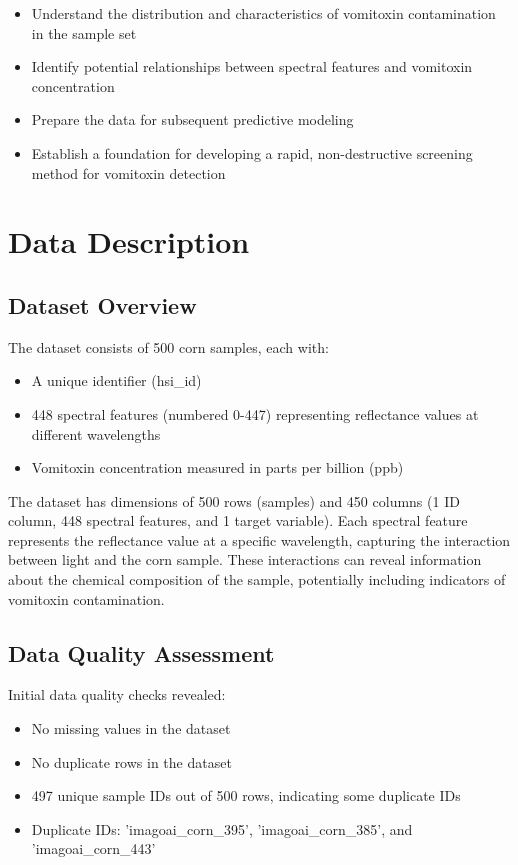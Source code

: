 \documentclass[12pt,a4paper]{article}
\begin{document}
\begin{itemize}
    \item Understand the distribution and characteristics of vomitoxin contamination in the sample set
    \item Identify potential relationships between spectral features and vomitoxin concentration
    \item Prepare the data for subsequent predictive modeling
    \item Establish a foundation for developing a rapid, non-destructive screening method for vomitoxin detection
\end{itemize}

\section{Data Description}

\subsection{Dataset Overview}
The dataset consists of 500 corn samples, each with:
\begin{itemize}
    \item A unique identifier (hsi\_id)
    \item 448 spectral features (numbered 0-447) representing reflectance values at different wavelengths
    \item Vomitoxin concentration measured in parts per billion (ppb)
\end{itemize}

The dataset has dimensions of 500 rows (samples) and 450 columns (1 ID column, 448 spectral features, and 1 target variable). Each spectral feature represents the reflectance value at a specific wavelength, capturing the interaction between light and the corn sample. These interactions can reveal information about the chemical composition of the sample, potentially including indicators of vomitoxin contamination.

\subsection{Data Quality Assessment}

Initial data quality checks revealed:
\begin{itemize}
    \item No missing values in the dataset
    \item No duplicate rows in the dataset
    \item 497 unique sample IDs out of 500 rows, indicating some duplicate IDs
    \item Duplicate IDs: 'imagoai\_corn\_395', 'imagoai\_corn\_385', and 'imagoai\_corn\_443'
\end{itemize}
\end{document}

